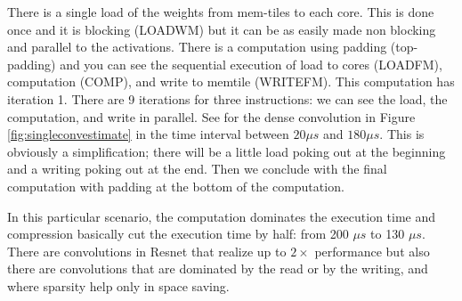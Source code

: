\documentclass[sigconf]{acmart}
\begin{document}
There is a single load of the weights from mem-tiles to each
core. This is done once and it is blocking (LOADWM) but it can be as
easily made non blocking and parallel to the activations. There is a
computation using padding (top-padding) and you can see the sequential
execution of load to cores (LOADFM), computation (COMP), and write to
memtile (WRITEFM). This computation has iteration 1. There are 9
iterations for three instructions: we can see the load, the
computation, and write in parallel. See for the dense convolution in
Figure \ref{fig:singleconvestimate} in the time interval between $20\mu\!s$
and $180\mu\!s$.  This is obviously a simplification; there will be
a little load poking out at the beginning and a writing poking out at
the end.  Then we conclude with the final computation with padding at
the bottom of the computation.

In this particular scenario, the computation dominates the execution
time and compression basically cut the execution time by half: from
200 $\mu s$ to 130 $\mu s$. There are convolutions in Resnet that realize
up to $2\times$ performance but also there are convolutions that are
dominated by the read or by the writing, and where sparsity help only
in space saving.

\end{document}
